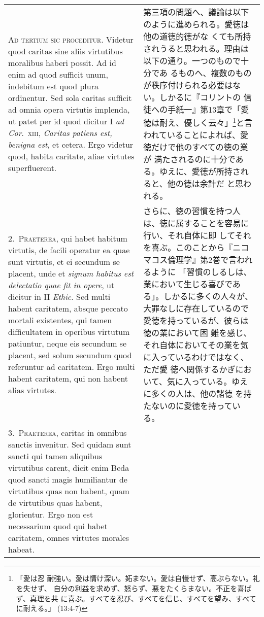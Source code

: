 \documentclass[10pt]{jsarticle}
\begin{document}
\begin{longtable}{p{21em}p{21em}}
 {\scshape Ad tertium sic proceditur}. Videtur quod caritas sine aliis
 virtutibus moralibus haberi possit. Ad id enim ad quod sufficit unum,
 indebitum est quod plura ordinentur. Sed sola caritas sufficit ad
 omnia opera virtutis implenda, ut patet per id quod dicitur I
 {\itshape ad Cor}.~{\scshape xiii}, {\itshape Caritas patiens est,
 benigna est}, et cetera. Ergo videtur quod, habita caritate, aliae
 virtutes superfluerent.
 
&

 第三項の問題へ、議論は以下のように進められる。愛徳は他の道徳的徳がな
 くても所持されうると思われる。理由は以下の通り。一つのもので十分であ
 るものへ、複数のものが秩序付けられる必要はない。しかるに『コリントの
 信徒への手紙一』第13章で「愛徳は耐え、優しく云々」\footnote{「愛は忍
 耐強い。愛は情け深い。妬まない。愛は自慢せず、高ぶらない。礼を失せず、
 自分の利益を求めず、怒らず、悪をたくらまない。不正を喜ばず、真理を共
 に喜ぶ。すべてを忍び、すべてを信じ、すべてを望み、すべてに耐える。」
 (13:4-7) }と言われていることによれば、愛徳だけで他のすべての徳の業が
 満たされるのに十分である。ゆえに、愛徳が所持されると、他の徳は余計だ
 と思われる。

\\

2.~{\scshape Praeterea}, qui habet habitum virtutis, de facili
operatur ea quae sunt virtutis, et ei secundum se placent, unde et
{\itshape signum habitus est delectatio quae fit in opere}, ut dicitur
in II {\itshape Ethic}. Sed multi habent caritatem, absque peccato
mortali existentes, qui tamen difficultatem in operibus virtutum
patiuntur, neque eis secundum se placent, sed solum secundum quod
referuntur ad caritatem. Ergo multi habent caritatem, qui non habent
alias virtutes.
 
&

 さらに、徳の習慣を持つ人は、徳に属することを容易に行い、それ自体に即
 してそれを喜ぶ。このことから『ニコマコス倫理学』第2巻で言われるように
 「習慣のしるしは、業において生じる喜びである」。しかるに多くの人々が、
 大罪なしに存在しているので愛徳を持っているが、彼らは徳の業において困
 難を感じ、それ自体においてその業を気に入っているわけではなく、ただ愛
 徳へ関係するかぎにおいて、気に入っている。ゆえに多くの人は、他の諸徳
 を持たないのに愛徳を持っている。

\\



3.~{\scshape Praeterea}, caritas in omnibus sanctis invenitur. Sed
quidam sunt sancti qui tamen aliquibus virtutibus carent, dicit enim
Beda quod sancti magis humiliantur de virtutibus quas non habent, quam
de virtutibus quas habent, glorientur. Ergo non est necessarium quod
qui habet caritatem, omnes virtutes morales habeat.


\end{longtable}
\end{document}
